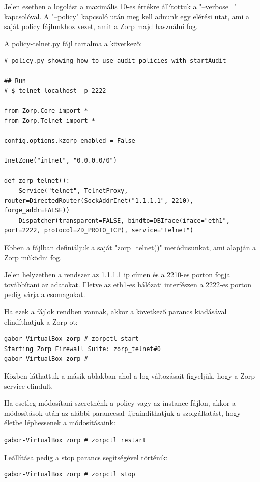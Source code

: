 \documentclass[a4paper,12pt,oneside]{report}
\begin{document}
\begin{enumerate}
Jelen esetben a logolást a maximális 10-es értékre állítottuk a "--verbose=" kapcsolóval.
A "--policy" kapcsoló után meg kell adnunk egy elérési utat, ami a saját policy fájlunkhoz vezet, amit a Zorp majd használni fog.

A policy-telnet.py fájl tartalma a következő:

\begin{lstlisting}
# policy.py showing how to use audit policies with startAudit

## Run
# $ telnet localhost -p 2222

from Zorp.Core import *
from Zorp.Telnet import *

config.options.kzorp_enabled = False

InetZone("intnet", "0.0.0.0/0")

def zorp_telnet():
    Service("telnet", TelnetProxy, router=DirectedRouter(SockAddrInet("1.1.1.1", 2210), forge_addr=FALSE))
    Dispatcher(transparent=FALSE, bindto=DBIface(iface="eth1", port=2222, protocol=ZD_PROTO_TCP), service="telnet")

\end{lstlisting}

Ebben a fájlban definiáljuk a saját "zorp\_telnet()" metódusunkat, ami alapján a Zorp működni fog.

Jelen helyzetben a rendszer az 1.1.1.1 ip címen és a 2210-es porton fogja továbbítani az adatokat.
Illetve az eth1-es hálózati interfészen a 2222-es porton pedig várja a csomagokat.

Ha ezek a fájlok rendben vannak, akkor a következő parancs kiadásával elindíthatjuk a Zorp-ot:

\begin{lstlisting}
gabor-VirtualBox zorp # zorpctl start
Starting Zorp Firewall Suite: zorp_telnet#0
gabor-VirtualBox zorp #
\end{lstlisting}

Közben láthattuk a másik ablakban ahol a log változásait figyeljük, hogy a Zorp service elindult.

Ha esetleg módosítani szeretnénk a policy vagy az instance fájlon, akkor a módosítások után az alábbi paranccsal újraindíthatjuk a szolgáltatást, hogy életbe léphessenek a módosításaink:

\begin{lstlisting}
gabor-VirtualBox zorp # zorpctl restart
\end{lstlisting}

Leállítása pedig a stop parancs segítségével történik:
\begin{lstlisting}
gabor-VirtualBox zorp # zorpctl stop
\end{lstlisting}


\end{enumerate}
\end{document}
